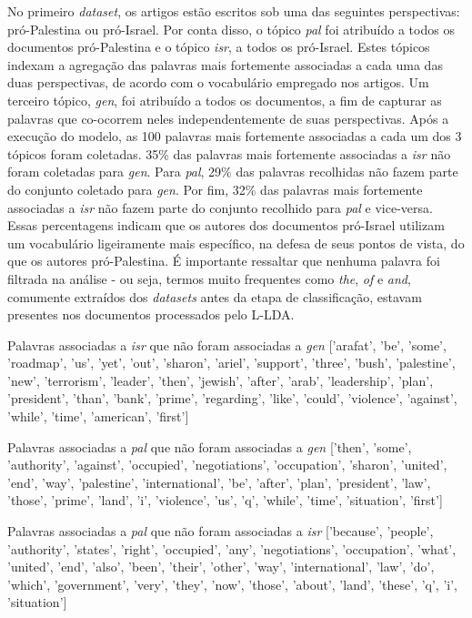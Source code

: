 No primeiro \emph{dataset}, os artigos estão escritos sob uma das seguintes perspectivas: pró-Palestina ou pró-Israel. Por conta disso, o tópico \emph{pal} foi atribuído a todos os documentos pró-Palestina e o tópico \emph{isr}, a todos os pró-Israel. Estes tópicos indexam a agregação das palavras mais fortemente associadas a cada uma das duas perspectivas, de acordo com o vocabulário empregado nos artigos. Um terceiro tópico, \emph{gen}, foi atribuído a todos os documentos, a fim de capturar as palavras que co-ocorrem neles independentemente de suas perspectivas. Após a execução do modelo, as 100 palavras mais fortemente associadas a cada um dos 3 tópicos foram coletadas. 35\% das palavras mais fortemente associadas a \emph{isr} não foram coletadas para \emph{gen}. Para \emph{pal}, 29\% das palavras recolhidas não fazem parte do conjunto coletado para \emph{gen}. Por fim, 32\% das palavras mais fortemente associadas a \emph{isr} não fazem parte do conjunto recolhido para \emph{pal} e vice-versa. Essas percentagens indicam que os autores dos documentos pró-Israel utilizam um vocabulário ligeiramente mais específico, na defesa de seus pontos de vista, do que os autores pró-Palestina. É importante ressaltar que nenhuma palavra foi filtrada na análise - ou seja, termos muito frequentes como \emph{the}, \emph{of} e \emph{and}, comumente extraídos dos \emph{datasets} antes da etapa de classificação, estavam presentes nos documentos processados pelo L-LDA.    

Palavras associadas a \emph{isr} que não foram associadas a \emph{gen}
['arafat', 'be', 'some', 'roadmap', 'us', 'yet', 'out', 'sharon', 'ariel', 'support', 'three', 'bush', 'palestine', 'new', 'terrorism', 'leader', 'then', 'jewish', 'after', 'arab', 'leadership', 'plan', 'president', 'than', 'bank', 'prime', 'regarding', 'like', 'could', 'violence', 'against', 'while', 'time', 'american', 'first']

Palavras associadas a \emph{pal} que não foram associadas a \emph{gen}
['then', 'some', 'authority', 'against', 'occupied', 'negotiations', 'occupation', 'sharon', 'united', 'end', 'way', 'palestine', 'international', 'be', 'after', 'plan', 'president', 'law', 'those', 'prime', 'land', 'i', 'violence', 'us', 'q', 'while', 'time', 'situation', 'first']

Palavras associadas a \emph{pal} que não foram associadas a \emph{isr}
['because', 'people', 'authority', 'states', 'right', 'occupied', 'any', 'negotiations', 'occupation', 'what', 'united', 'end', 'also', 'been', 'their', 'other', 'way', 'international', 'law', 'do', 'which', 'government', 'very', 'they', 'now', 'those', 'about', 'land', 'these', 'q', 'i', 'situation']

